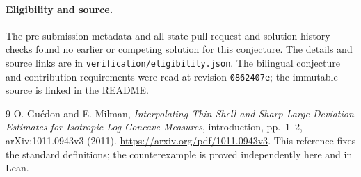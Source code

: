 \documentclass[11pt]{article}
\begin{document}
\paragraph{Eligibility and source.}
The pre-submission metadata and all-state pull-request and solution-history checks found no earlier or competing solution for this conjecture. The details and source links are in \texttt{verification/eligibility.json}. The bilingual conjecture and contribution requirements were read at revision \texttt{0862407e}; the immutable source is linked in the README.

\begin{thebibliography}{9}
 O. Gu\'edon and E. Milman, \emph{Interpolating Thin-Shell and Sharp Large-Deviation Estimates for Isotropic Log-Concave Measures}, introduction, pp.~1--2, arXiv:1011.0943v3 (2011). \url{https://arxiv.org/pdf/1011.0943v3}. This reference fixes the standard definitions; the counterexample is proved independently here and in Lean.
\end{thebibliography}
\end{document}
